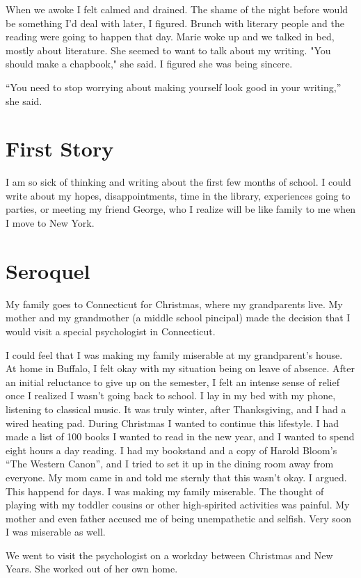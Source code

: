 \documentclass[12pt]{article}
\begin{document}
When we awoke I felt calmed and drained.  The shame of the night before would be
something I'd deal with later, I figured.  Brunch with literary people and the
reading were going to happen that day.  Marie woke up and we talked in bed,
mostly about literature.  She seemed to want to talk about my writing.  "You
should make a chapbook," she said.  I figured she was being sincere.  

``You need to stop worrying about making yourself look good in your writing,'' she
said.

\section{First Story}
I am so sick of thinking and writing about the first few months of school.  I
could write about my hopes, disappointments, time in the library, experiences
going to parties, or meeting my friend George, who I realize will be like family
to me when I move to New York. 


\section{Seroquel}
My family goes to Connecticut for Christmas, where my grandparents live.  My
mother and my grandmother (a middle school pincipal) made the decision that I
would visit a special psychologist in Connecticut.

I could feel that I was making my family miserable at my grandparent's house.
At home in Buffalo, I felt okay with my situation being on leave of absence.
After an initial reluctance to give up on the semester, I felt an intense sense
of relief once I realized I wasn't going back to school.  I lay in my bed with my
phone, listening to classical music.  It was truly winter, after Thanksgiving,
and I had a wired heating pad.  During Christmas I wanted to continue this
lifestyle.  I had made a list of 100 books I wanted to read in the new year,
and I wanted to spend eight hours a day reading.  I had my bookstand and a copy
of Harold Bloom's ``The Western Canon'', and I tried to set it up in the dining
room away from everyone.  My mom came in and told me sternly that this wasn't
okay.  I argued.  This happend for days.  I was making my family miserable.  The
thought of playing with my toddler cousins or other high-spirited activities was
painful.  My mother and even father accused me of being unempathetic and
selfish.  Very soon I was miserable as well.

We went to visit the psychologist on a workday between Christmas and New
Years.  She worked out of her own home. 
\end{document}

